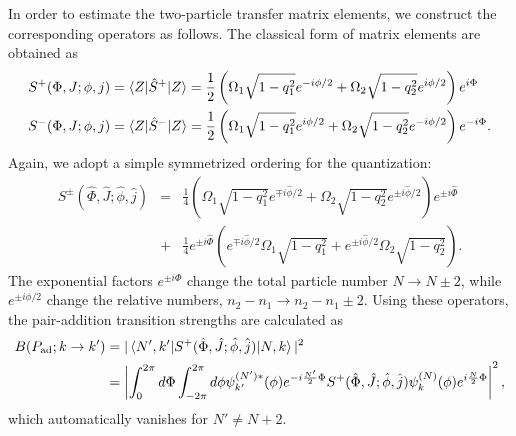 \documentclass[%
superscriptaddress,
preprint,
showpacs,
nofootinbib,
amsmath,amssymb,
aps,
prc,
floatfix ]%
{revtex4-1}
\begin{document}
In order to estimate the two-particle transfer matrix elements,
we construct the corresponding operators as follows.
The classical form of matrix elements are obtained as
\begin{align}
  S^+(\Phi,J;\phi,j) &= \braket{Z|\hat{S}^+|Z}
 = \frac{1}{2}
\left( \Omega_1\sqrt{1-q_1^2}e^{-i\phi/2}+\Omega_2\sqrt{1-q_2^2}e^{i\phi/2} \right) e^{i\Phi}
	\label{Sp_mean_value} \\
  S^-(\Phi,J;\phi,j) &= \braket{Z|\hat{S}^-|Z}
 = \frac{1}{2}
\left( \Omega_1\sqrt{1-q_1^2}e^{i\phi/2}+\Omega_2\sqrt{1-q_2^2}e^{-i\phi/2} \right) e^{-i\Phi} .
	\label{Sm_mean_value}
\end{align}
Again, we adopt a simple symmetrized ordering for the quantization:
\begin{eqnarray}
  S^\pm (\hat{\Phi},\hat{J};\hat{\phi},\hat{j})
	&=& \frac{1}{4}\left( \Omega_1\sqrt{1-q_1^2}e^{\mp i\hat{\phi}/2}
+\Omega_2\sqrt{1-q_2^2}e^{\pm i\hat{\phi}/2} \right) e^{\pm i\hat{\Phi}} 
	\nonumber \\
&+ & \frac{1}{4}e^{\pm i\hat{\Phi}}\left( 
e^{\mp i\hat{\phi}/2}\Omega_1\sqrt{1-q_1^2}
+e^{\pm i\hat{\phi}/2}\Omega_2\sqrt{1-q_2^2} \right) .
\end{eqnarray}
The exponential factors $e^{\pm i\Phi}$ change
the total particle number $N\rightarrow N\pm 2$,
while $e^{\pm i\phi/2}$ change the relative numbers,
$n_2-n_1 \rightarrow n_2-n_1 \pm 2$.
Using these operators,
the pair-addition transition strengths are calculated as
\begin{align}
B(P_{\rm ad};k\rightarrow k') &=
|\braket{N',k'|S^+(\hat{\Phi},\hat{J};\hat{\phi},\hat{j})|N,k}|^2
	\nonumber \\
&= \left| \int_{0}^{2\pi}d\Phi \int_{-2\pi}^{2\pi}d\phi 
	\psi^{(N')*}_{k'}(\phi) e^{-i\frac{N'}{2}\Phi}
	S^+(\hat{\Phi},\hat{J};\hat{\phi},\hat{j})
	\psi^{(N)}_{k}(\phi)e^{i\frac{N}{2}\Phi} \right|^2,
\end{align}
which automatically vanishes for $N'\neq N+2$.
\end{document}
